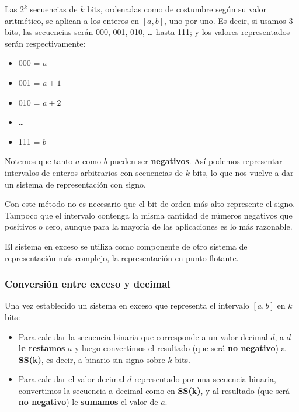 \documentclass[spanish,a4paper,]{article}
\providecommand{\tightlist}{%
  \setlength{\itemsep}{0pt}\setlength{\parskip}{0pt}}
\begin{document}
Las \(2^k\) secuencias de \(k\) bits, ordenadas como de costumbre según
su valor aritmético, se aplican a los enteros en \([a, b]\), uno por
uno. Es decir, si usamos 3 bits, las secuencias serán 000, 001, 010,
\ldots{} hasta 111; y los valores representados serán respectivamente:

\begin{itemize}
\tightlist
\item
  000 = \(a\)
\item
  001 = \(a + 1\)
\item
  010 = \(a + 2\)
\item
  \ldots{}
\item
  111 = \(b\)
\end{itemize}

Notemos que tanto \(a\) como \(b\) pueden ser \textbf{negativos}. Así
podemos representar intervalos de enteros arbitrarios con secuencias de
\(k\) bits, lo que nos vuelve a dar un sistema de representación con
signo.

Con este método no es necesario que el bit de orden más alto represente
el signo. Tampoco que el intervalo contenga la misma cantidad de números
negativos que positivos o cero, aunque para la mayoría de las
aplicaciones es lo más razonable.

El sistema en exceso se utiliza como componente de otro sistema de
representación más complejo, la representación en punto flotante.

\hypertarget{conversiuxf3n-entre-exceso-y-decimal}{%
\subsubsection{Conversión entre exceso y
decimal}\label{conversiuxf3n-entre-exceso-y-decimal}}

Una vez establecido un sistema en exceso que representa el intervalo
\([a, b]\) en \(k\) bits:

\begin{itemize}
\tightlist
\item
  Para calcular la secuencia binaria que corresponde a un valor decimal
  \(d\), a \(d\) \textbf{le restamos} \(a\) y luego convertimos el
  resultado (que será \textbf{no negativo}) a \textbf{SS(k)}, es decir,
  a binario sin signo sobre \(k\) bits.
\item
  Para calcular el valor decimal \(d\) representado por una secuencia
  binaria, convertimos la secuencia a decimal como en \textbf{SS(k)}, y
  al resultado (que será \textbf{no negativo}) le \textbf{sumamos} el
  valor de \(a\).
\end{itemize}
\end{document}
